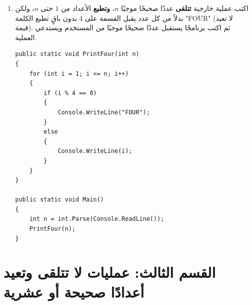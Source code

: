 \documentclass[14pt]{extarticle}
\begin{document}
\begin{enumerate}[resume, itemsep=1em]
\begin{boxSolution}
\begin{english}
\begin{verbatim}
public static void Main()
{
    PrintTotalCost(15.5);
}
\end{verbatim}
\end{english}
\end{boxSolution}
\fi
\filbreak

\item اكتب عملية خارجية \textbf{تتلقى} عددًا صحيحًا موجبًا $n$، \textbf{وتطبع} الأعداد من $1$ حتى $n$، ولكن بدلاً من كل عدد يقبل القسمة على $4$ بدون باقٍ تطبع الكلمة \textenglish{"FOUR"} (لا تعيد قيمة). ثم اكتب برنامجًا يستقبل عددًا صحيحًا موجبًا من المستخدم ويستدعي العملية.
\ifwithsols
\begin{boxSolution}
\begin{english}
\begin{verbatim}
public static void PrintFour(int n)
{
    for (int i = 1; i <= n; i++)
    {
        if (i % 4 == 0)
        {
            Console.WriteLine("FOUR");
        }
        else
        {
            Console.WriteLine(i);
        }
    }
}

public static void Main()
{
    int n = int.Parse(Console.ReadLine());
    PrintFour(n);
}
\end{verbatim}
\end{english}
\end{boxSolution}
\fi
\filbreak

\end{enumerate}

\filbreak
\section*{القسم الثالث: عمليات لا تتلقى وتعيد أعدادًا صحيحة أو عشرية}
\end{document}
